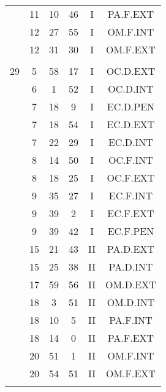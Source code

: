 \documentclass[12pt, a4paper]{article}
\begin{document}
\begin{multicols}{3}
{\begin{tabular}{c c c c c c}
	 	 	 	 & 11 & 10 & 46 & I & PA.F.EXT\\%
	 	 	 	 & 12 & 27 & 55 & I & OM.F.INT\\%
	 	 	 	 & 12 & 31 & 30 & I & OM.F.EXT\\%
	 	 	 	 & & & & & \\%
	 	 	 	29 & 5 & 58 & 17 & I & OC.D.EXT\\%
	 	 	 	 & 6 & 1 & 52 & I & OC.D.INT\\%
	 	 	 	 & 7 & 18 & 9 & I & EC.D.PEN\\%
	 	 	 	 & 7 & 18 & 54 & I & EC.D.EXT\\%
	 	 	 	 & 7 & 22 & 29 & I & EC.D.INT\\%
	 	 	 	 & 8 & 14 & 50 & I & OC.F.INT\\%
	 	 	 	 & 8 & 18 & 25 & I & OC.F.EXT\\%
	 	 	 	 & 9 & 35 & 27 & I & EC.F.INT\\%
	 	 	 	 & 9 & 39 & 2 & I & EC.F.EXT\\%
	 	 	 	 & 9 & 39 & 42 & I & EC.F.PEN\\%
	 	 	 	 & 15 & 21 & 43 & II & PA.D.EXT\\%
	 	 	 	 & 15 & 25 & 38 & II & PA.D.INT\\%
	 	 	 	 & 17 & 59 & 56 & II & OM.D.EXT\\%
	 	 	 	 & 18 & 3 & 51 & II & OM.D.INT\\%
	 	 	 	 & 18 & 10 & 5 & II & PA.F.INT\\%
	 	 	 	 & 18 & 14 & 0 & II & PA.F.EXT\\%
	 	 	 	 & 20 & 51 & 1 & II & OM.F.INT\\%
	 	 	 	 & 20 & 54 & 51 & II & OM.F.EXT\\%
	 	 	 	 & & & & & \\%

\end{tabular}}
\end{multicols}
\end{document}
